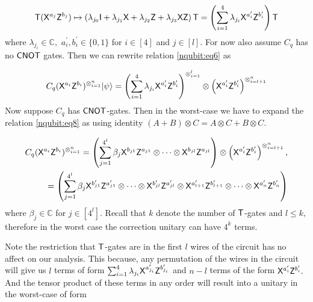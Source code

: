 \begin{equation}
\begin{aligned}
\label{nqubit:eq7}
{\sf T}({\sf X}^{a_{j}}{\sf Z}^{b_{j}})\mapsto \left(\lambda_{j_0} {\sf I} + \lambda_{j_1} {\sf X} + \lambda_{j_2} {\sf Z} + \lambda_{j_3} {\sf X} {\sf Z} \right){\sf T}=\left(\sum_{i=1}^4 \lambda_{j_i} {\sf X}^{a_{i}^\prime}{\sf Z}^{b_{i}^\prime}\right){\sf T}\\
 \end{aligned}
\end{equation}
where $\lambda_{j_i}\in\mathbb{C}, $  $a_{i}^\prime, b_{i}^\prime \in\{0,1\}$ for $i\in[4]$ and $j\in[l].$ For now also assume $C_q$ has no ${\sf CNOT}$ gates. Then we can rewrite relation \ref{nqubit:eq6} as 


\begin{equation}
\label{nqubit:eq8}
\begin{aligned}
 C_q ({\sf X}^{a_{i}}{\sf Z}^{b_{i}})^{\otimes_{i=1}^{n}}{\lvert}\psi\rangle= \left(\sum_{i=1}^4 \lambda_{j_i} {\sf X}^{a_{i}^\prime}{\sf Z}^{b_{i}^\prime}\right)^{\otimes_{i=1}^{l}} \otimes \left({\sf X}^{a_{i}^\prime}{\sf Z}^{b_{i}^\prime}\right)^{\otimes_{i=l+1}^{n}}\\
\end{aligned}
\end{equation}
Now suppose $C_q$ has ${\sf CNOT}$-gates. Then in the worst-case we have to expand the relation \ref{nqubit:eq8} as using identity $(A+B)\otimes C=A\otimes C + B\otimes C.$

 
\begin{equation}
\label{nqubit:eq9}
\begin{aligned}
C_q ({\sf X}^{a_{i}}{\sf Z}^{b_{i}})^{\otimes_{i=1}^{n}}=\left(\sum_{j=1}^{4^l} \beta_j {\sf X}^{b_{j1}}{\sf Z}^{a_{j1}} \otimes \cdots \otimes{\sf X}^{b_{jl}}{\sf Z}^{a_{jl}}\right) \otimes \left({\sf X}^{a_{i}^\prime}{\sf Z}^{b_{i}^\prime}\right)^{\otimes_{i=l+1}^{n}}, \\
 =\left(\sum_{j=1}^{4^{l}} \beta_j {\sf X}^{b_{j1}^\prime}{\sf Z}^{a_{j1}^\prime} \otimes \cdots \otimes{\sf X}^{b_{jl}^\prime}{\sf Z}^{a_{jl}^\prime} \otimes {\sf X}^{a_{l+1}^\prime}{\sf Z}^{b_{l+1}^\prime}  \otimes \cdots   \otimes{\sf X}^{a_{n}^\prime}{\sf Z}^{b_{n}^\prime}\right)
 \end{aligned}
\end{equation}
where $\beta_j\in \mathbb{C}$ for $j\in[4^l].$  Recall that $k$ denote the number of ${\sf T}$-gates and $l\leq k,$ therefore in the worst case the correction unitary can have $4^k$ terms. 

\begin{remark}
\label{remark:nqubit-correction1}
Note the restriction that ${\sf T}$-gates are in the first $l$ wires of the circuit has no affect on our analysis. This because, any permutation of the wires in the circuit will give us $l$ terms of form $\sum_{i=1}^4 \lambda_{j_i} {\sf X}^{a_{j_i}^\prime} {\sf Z}^{b_{j_i}^\prime}$ and $n-l$ terms of the form ${\sf X}^{a_{i}^\prime} {\sf Z}^{b_{i}^\prime}.$  And the tensor product of these terms in any order will result into a unitary in the worst-case of form
\end{remark}

